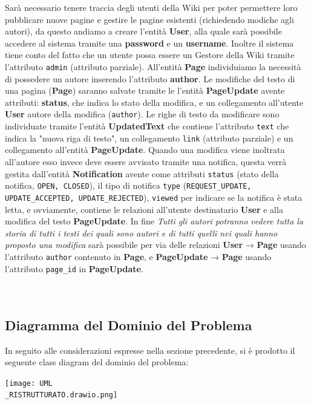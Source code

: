 \documentclass{article}
\begin{document}
		
		Sarà necessario tenere traccia degli utenti della Wiki per poter permettere loro pubblicare nuove pagine e gestire le pagine esistenti (richiedendo modiche agli autori), da questo andiamo a creare l'entità \textbf{User}, alla quale sarà possibile accedere al sistema tramite una \textbf{password} e un \textbf{username}. Inoltre il sistema tiene conto del fatto che un utente possa essere un Gestore della Wiki tramite l'attributo \texttt{admin} (attributo parziale).
		All'entità \textbf{Page} individuiamo la necessità di possedere un autore inserendo l'attributo \textbf{author}. Le modifiche del testo di una pagina (\textbf {Page}) saranno salvate tramite le l'entità \textbf {PageUpdate} avente attributi: \textbf{status}, che indica lo stato della modifica, e un collegamento all'utente \textbf{User} autore della modifica (\texttt {author}). Le righe di testo da modificare sono individuate tramite l'entità \textbf {UpdatedText} che contiene l'attributo \texttt{text} che indica la "nuova riga di testo", un collegamento \texttt{link} (attributo parziale) e un collegamento all'entità \textbf{PageUpdate}.
		Quando una modifica viene inoltrata all'autore esso invece deve essere avvisato tramite una notifica, questa verrà gestita dall'entità \textbf{Notification} avente come attributi \texttt{status} (stato della notifica, \texttt{OPEN, CLOSED}), il tipo di notifica \texttt{type} (\texttt{REQUEST\_UPDATE, UPDATE\_ACCEPTED, UPDATE\_REJECTED}), \texttt{viewed} per indicare se la notifica è stata letta, e ovviamente, contiene le relazioni all'utente destinatario \textbf{User} e alla modifica del testo \textbf{PageUpdate}. 
		In fine \textit{Tutti gli autori potranno vedere tutta la storia di tutti i testi dei quali sono autori e di tutti quelli nei quali hanno proposto una modifica} sarà possibile per via delle relazioni \textbf{User} → \textbf{Page} usando l'attributo \texttt{author} contenuto in \textbf{Page}, e \textbf{PageUpdate} → \textbf{Page} usando l'attributo \texttt{page\_id} in \textbf{PageUpdate}.
		\\\\\\
		
		\newpage
		
		\subsection{Diagramma del Dominio del Problema}
		In seguito alle considerazioni espresse nella sezione precedente, si è prodotto il seguente class diagram del dominio del problema:
		\begin{center}
			\texttt{[image: UML\\\_RISTRUTTURATO.drawio.png]}
		\end{center}
		
\end{document}
